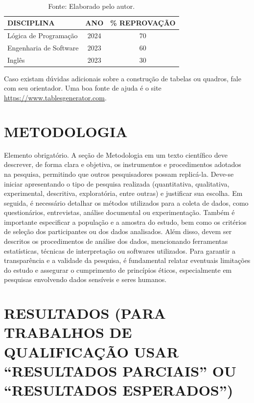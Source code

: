 \documentclass[
	article,             %
	12pt,                %
	oneside,             %
	a4paper,             %
	english,             %
	brazil,              %
	sumario=tradicional
]{abntex2}
\begin{document}
\begin{table}[ht]
	\centering
	\caption{Porcentagem de reprovação de diciplinas.}
	\begin{tabular}{l c c} %
		\toprule
		DISCIPLINA & ANO & \% REPROVAÇÃO \\ 
		\midrule
		Lógica de Programação            & 2024 & 70 \\
		Engenharia de Software           & 2023 & 60 \\
		Inglês                           & 2023 & 30 \\
		\bottomrule
	\end{tabular}
	\caption*{\\Fonte: Elaborado pelo autor.}
	\label{tab:clubes}
\end{table}

Caso existam dúvidas adicionais sobre a construção de tabelas ou quadros, fale com seu orientador. Uma boa fonte de ajuda é o site \url{https://www.tablesgenerator.com}.

\section{\textbf{METODOLOGIA}}

Elemento obrigatório. A seção de Metodologia em um texto científico deve descrever, de forma clara e objetiva, os instrumentos e procedimentos adotados na pesquisa, permitindo que outros pesquisadores possam replicá-la. Deve-se iniciar apresentando o tipo de pesquisa realizada (quantitativa, qualitativa, experimental, descritiva, exploratória, entre outras) e justificar sua escolha. Em seguida, é necessário detalhar os métodos utilizados para a coleta de dados, como questionários, entrevistas, análise documental ou experimentação. Também é importante especificar a população e a amostra do estudo, bem como os critérios de seleção dos participantes ou dos dados analisados. Além disso, devem ser descritos os procedimentos de análise dos dados, mencionando ferramentas estatísticas, técnicas de interpretação ou softwares utilizados. Para garantir a transparência e a validade da pesquisa, é fundamental relatar eventuais limitações do estudo e assegurar o cumprimento de princípios éticos, especialmente em pesquisas envolvendo dados sensíveis e seres humanos.

\section{\textbf{RESULTADOS (PARA TRABALHOS DE QUALIFICAÇÃO USAR “RESULTADOS PARCIAIS” OU “RESULTADOS ESPERADOS”)}}
\end{document}
